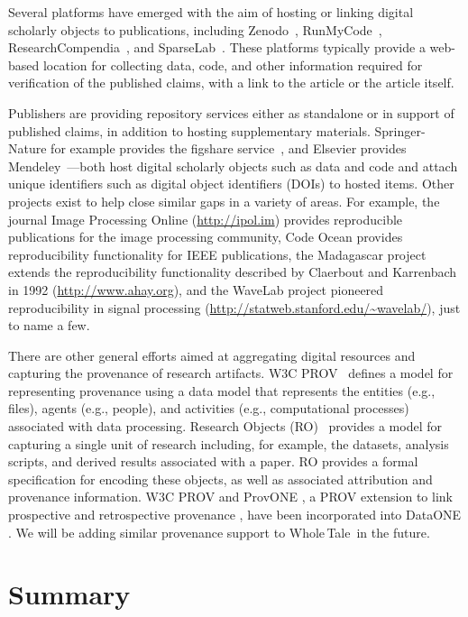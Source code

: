 \documentclass{elsarticle}
\newcommand{\wt}{Whole\,Tale}
\begin{document}
Several platforms have emerged with the aim of hosting or linking digital scholarly objects to publications, including Zenodo~\cite{zenodo}, RunMyCode~\cite{stodden12runmycode}, ResearchCompendia~\cite{stodden15resaerchcompendia}, and SparseLab~\cite{sparselab}. 
These platforms typically provide a web-based location for collecting data, code, and 
other information required for verification of the published claims, with a link to 
the article or the article itself.

Publishers are providing repository services either as standalone or in support of published claims, in addition to hosting supplementary materials. Springer-Nature for example provides the figshare service~\cite{figshare}, and Elsevier provides Mendeley~\cite{mendeley}---both host digital scholarly objects such as data and code and attach unique identifiers such as digital object identifiers (DOIs) to hosted items. Other projects exist to help close similar gaps in a variety of areas. For example, the journal Image Processing Online (\url{http://ipol.im}) provides reproducible publications for the image processing community, Code Ocean provides reproducibility functionality for IEEE publications, the Madagascar project extends the reproducibility functionality described by Claerbout and Karrenbach in 1992 (\url{http://www.ahay.org}), and the WaveLab project pioneered reproducibility in signal processing (\url{http://statweb.stanford.edu/~wavelab/}), just to name a few.

There are other general efforts aimed at aggregating 
digital resources and capturing the provenance of research artifacts.
W3C PROV~\cite{w3c-prov-primer} defines a model 
for representing provenance using a data model that 
represents the entities (e.g., files), agents (e.g., people), and activities (e.g., computational processes)
associated with data processing.  
 Research Objects (RO)~\cite{bechhofer2010research}
provides a model for capturing a single unit of research including, for example,
the datasets, analysis scripts, and derived results associated 
with a paper. RO provides a formal specification for 
encoding these objects, as well as associated attribution
and provenance information. W3C PROV and ProvONE \cite{cuevas2015provone},  a PROV extension 
to link prospective and retrospective provenance \cite{mcphillips2015retrospective}, have been incorporated into DataONE \cite{cao_dataone:_2016}. 
We will be adding similar provenance support to \wt\ in the future.

\section{Summary}\label{sec:summary}
\end{document}
